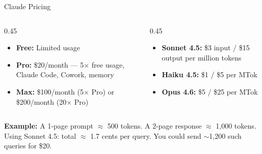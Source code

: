 \documentclass[aspectratio=169]{beamer}
\begin{document}
\begin{frame}{Claude Pricing}
\begin{columns}[T]
\begin{column}{0.45\textwidth}
\begin{shadedbox}[title=\textbf{Subscription Plans}]
\begin{itemize}\small
  \item \textbf{Free:} Limited usage
  \item \textbf{Pro:} \$20/month --- 5$\times$ free usage, Claude Code, Cowork, memory
  \item \textbf{Max:} \$100/month (5$\times$ Pro) or \$200/month (20$\times$ Pro)
\end{itemize}
\end{shadedbox}
\end{column}
\begin{column}{0.45\textwidth}
\begin{shadedbox}[title=\textbf{API (Pay Per Token)}]
\begin{itemize}\small
  \item \textbf{Sonnet 4.5:} \$3 input / \$15 output per million tokens
  \item \textbf{Haiku 4.5:} \$1 / \$5 per MTok
  \item \textbf{Opus 4.6:} \$5 / \$25 per MTok
\end{itemize}
\end{shadedbox}
\end{column}
\end{columns}
\vspace{0.2cm}
\small \textbf{Example:} A 1-page prompt $\approx$ 500 tokens. A 2-page response $\approx$ 1{,}000 tokens.
Using Sonnet 4.5: total $\approx$ 1.7 cents per query. You could send $\sim$1{,}200 such queries for \$20.
\end{frame}
\end{document}

